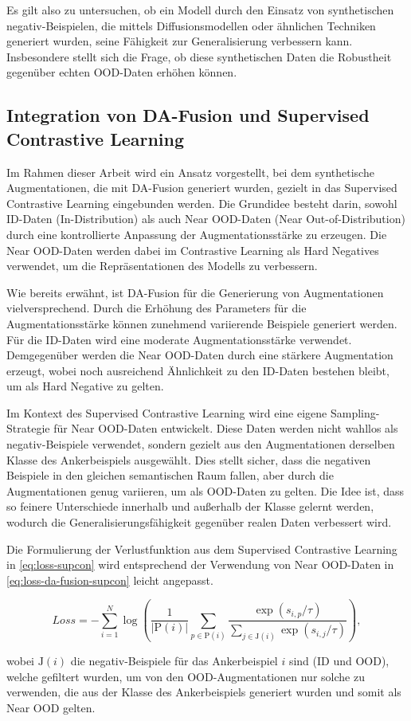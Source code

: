 Es gilt also zu untersuchen, ob ein Modell durch den Einsatz von synthetischen negativ-Beispielen, die mittels Diffusionsmodellen oder ähnlichen Techniken generiert wurden, seine Fähigkeit zur Generalisierung verbessern kann. Insbesondere stellt sich die Frage, ob diese synthetischen Daten die Robustheit gegenüber echten OOD-Daten erhöhen können.

\subsection{Integration von DA-Fusion und Supervised Contrastive Learning} \label{subsec:da-fusion-supcon}

Im Rahmen dieser Arbeit wird ein Ansatz vorgestellt, bei dem synthetische Augmentationen, die mit DA-Fusion generiert wurden, gezielt in das Supervised Contrastive Learning eingebunden werden. Die Grundidee besteht darin, sowohl ID-Daten (In-Distribution) als auch Near OOD-Daten (Near Out-of-Distribution) durch eine kontrollierte Anpassung der Augmentationsstärke zu erzeugen. Die Near OOD-Daten werden dabei im Contrastive Learning als Hard Negatives verwendet, um die Repräsentationen des Modells zu verbessern.

Wie bereits erwähnt, ist DA-Fusion für die Generierung von Augmentationen vielversprechend. Durch die Erhöhung des Parameters für die Augmentationsstärke können zunehmend variierende Beispiele generiert werden. Für die ID-Daten wird eine moderate Augmentationsstärke verwendet. Demgegenüber werden die Near OOD-Daten durch eine stärkere Augmentation erzeugt, wobei noch ausreichend Ähnlichkeit zu den ID-Daten bestehen bleibt, um als Hard Negative zu gelten.

Im Kontext des Supervised Contrastive Learning wird eine eigene Sampling-Strategie für Near OOD-Daten entwickelt. Diese Daten werden nicht wahllos als negativ-Beispiele verwendet, sondern gezielt aus den Augmentationen derselben Klasse des Ankerbeispiels ausgewählt. Dies stellt sicher, dass die negativen Beispiele in den gleichen semantischen Raum fallen, aber durch die Augmentationen genug variieren, um als OOD-Daten zu gelten. Die Idee ist, dass so feinere Unterschiede innerhalb und außerhalb der Klasse gelernt werden, wodurch die Generalisierungsfähigkeit gegenüber realen Daten verbessert wird.

Die Formulierung der Verlustfunktion aus dem Supervised Contrastive Learning in \autoref{eq:loss-supcon} wird entsprechend der Verwendung von Near OOD-Daten in \autoref{eq:loss-da-fusion-supcon} leicht angepasst.

\begin{equation}
	Loss = - \sum_{i=1}^{N} \log \left( \frac{1}{|\text{P}(i)|} \sum_{p \in \text{P}(i)} \frac{\exp(s_{i,p}/\tau)}{\sum_{j \in \text{J}(i)} \exp(s_{i,j}/\tau)} \right),
	\label{eq:loss-da-fusion-supcon}
\end{equation} %

wobei $\text{J}(i)$ die negativ-Beispiele für das Ankerbeispiel $i$ sind (ID und OOD), welche gefiltert wurden, um von den OOD-Augmentationen nur solche zu verwenden, die aus der Klasse des Ankerbeispiels generiert wurden und somit als Near OOD gelten.